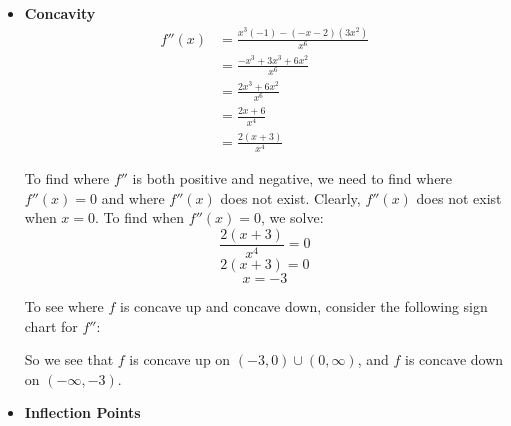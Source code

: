\documentclass[nooutcomes]{ximera}
\newcommand{\dfn}{\textbf}
\renewenvironment{freeResponse}{
\ifhandout\setbox0\vbox\bgroup\else
\begin{trivlist}\item[\hskip \labelsep\bfseries Solution:\hspace{2ex}]
\fi}
{\ifhandout\egroup\else
\end{trivlist}
\fi}
\begin{document}
\begin{problem}
\begin{freeResponse}
\begin{itemize}
			
			
			\item  \dfn{Concavity}
			\begin{align*}
			f''(x) &= \frac{x^3(-1) - (-x-2)(3x^2)}{x^6} \\
			&= \frac{-x^3 + 3x^3 + 6x^2}{x^6} \\
			&= \frac{2x^3 + 6x^2}{x^6} \\
			&= \frac{2x+6}{x^4} \\
			&= \frac{2(x+3)}{x^4}
			\end{align*}
			
			To find where $f''$ is both positive and negative, we need to find where $f''(x) = 0$ and where $f''(x)$ does not exist.  Clearly, $f''(x)$ does not exist when $x=0$.  To find when $f''(x) = 0$, we solve:
			$$ \frac{2(x+3)}{x^4} = 0 $$
			$$ 2(x+3) = 0 $$
			$$ x=-3 $$
			
			To see where $f$ is concave up and concave down, consider the following sign chart for $f''$:
			
		
\begin{center}
\begin{image}
\end{image}
\end{center}


			So we see that $f$ is concave up on $(-3,0) \cup (0,\infty)$, and $f$ is concave down on $(-\infty, -3)$.

			
			
			
			\item  \dfn{Inflection Points}  \\
			

\end{itemize}
\end{freeResponse}
\end{problem}
\end{document}
